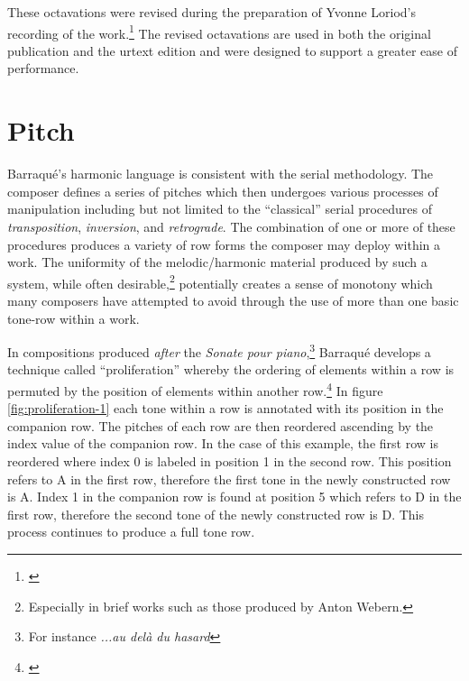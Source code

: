 These octavations were revised during the preparation of Yvonne Loriod's recording of the work.\footnote{\citet[75]{barraque-commentary}} The revised octavations are used in both the original publication and the urtext edition and were designed to support a greater ease of performance.

\section{Pitch}

Barraqué's harmonic language is consistent with the serial methodology. The composer defines a series of pitches which then undergoes various processes of manipulation including but not limited to the ``classical'' serial procedures of \emph{transposition}, \emph{inversion}, and \emph{retrograde}. The combination of one or more of these procedures produces a variety of row forms the composer may deploy within a work. The uniformity of the melodic/harmonic material produced by such a system, while often desirable,\footnote{Especially in brief works such as those produced by Anton Webern.} potentially creates a sense of monotony which many composers have attempted to avoid through the use of more than one basic tone-row within a work.

In compositions produced \emph{after} the \textit{Sonate pour piano},\footnote{For instance \textit{...au delà du hasard}} Barraqué develops a technique called ``proliferation'' whereby the ordering of elements within a row is permuted by the position of elements within another row.\footnote{\citet[20]{barraque-konzepte}} In figure \ref{fig:proliferation-1} each tone within a row is annotated with its position in the companion row. The pitches of each row are then reordered ascending by the index value of the companion row. In the case of this example, the first row is reordered where index 0 is labeled in position 1 in the second row. This position refers to A\myflat \hspace{0.5mm} in the first row, therefore the first tone in the newly constructed row is A\myflat. Index 1 in the companion row is found at position 5 which refers to D\mynatural \hspace{0.5mm} in the first row, therefore the second tone of the newly constructed row is D\mynatural. This process continues to produce a full tone row.

